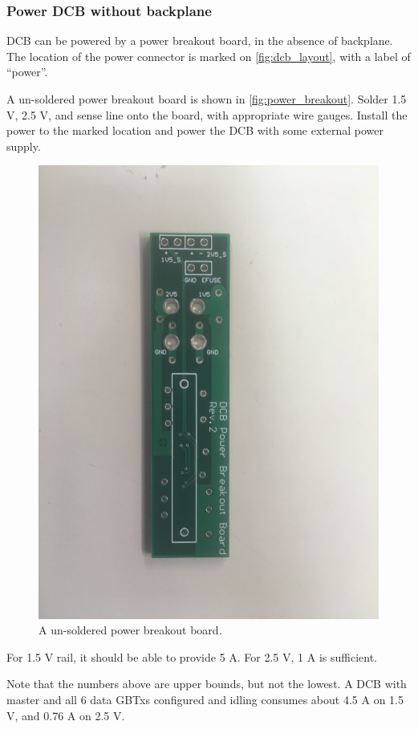 \subsubsection{Power DCB without backplane}
DCB can be powered by a power breakout board, in the absence of backplane.
The location of the power connector is marked on \autoref{fig:dcb_layout}, with
a label of ``power''.

A un-soldered power breakout board is shown in \autoref{fig:power_breakout}.
Solder 1.5 V, 2.5 V, and sense line onto the board, with appropriate wire
gauges.
Install the power to the marked location and power the DCB with some external
power supply.

\begin{figure}[!ht]
    \centering
    \includegraphics[width=0.9\linewidth]{res/power_breakout_board.jpg}
    \caption{A un-soldered power breakout board.}
    \label{fig:power_breakout}
\end{figure}

\begin{leftbar}
    For 1.5 V rail, it should be able to provide 5 A.
    For 2.5 V, 1 A is sufficient.

    Note that the numbers above are upper bounds, but not the lowest.
    A DCB with master and all 6 data GBTxs configured and idling consumes about
    4.5 A on 1.5 V, and 0.76 A on 2.5 V.
\end{leftbar}
